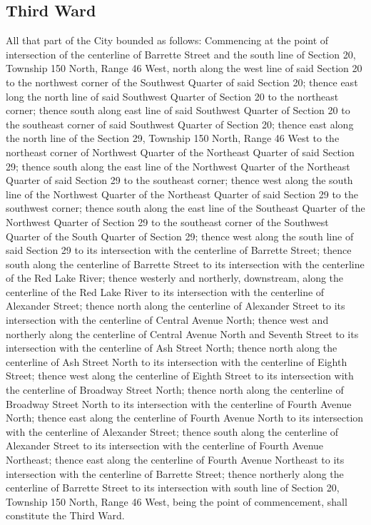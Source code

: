 \subsection{Third Ward}
All that part of the City bounded as follows:  Commencing at the point of intersection of the centerline of Barrette Street and the south line of Section 20, Township 150 North, Range 46 West, north along the west line of said Section 20 to the northwest corner of the Southwest Quarter of said Section 20; thence east long the north line of said Southwest Quarter of Section 20 to the northeast corner; thence south along east line of said Southwest Quarter of Section 20 to the southeast corner of said Southwest Quarter of Section 20; thence east along the north line of the Section 29, Township 150 North, Range 46 West to the northeast corner of Northwest Quarter of the Northeast Quarter of said Section 29; thence south along the east line of the Northwest Quarter of the Northeast Quarter of said Section 29 to the southeast corner; thence west along the south line of the Northwest Quarter of the Northeast Quarter of said Section 29 to the southwest corner; thence south along the east line of the Southeast Quarter of the Northwest Quarter of Section 29 to the southeast corner of the Southwest Quarter of the South Quarter of Section 29; thence west along the south line of said Section 29 to its intersection with the centerline of Barrette Street; thence south along the centerline of Barrette Street to its intersection with the centerline of the Red Lake River; thence westerly and northerly, downstream, along the centerline of the Red Lake River to its intersection with the centerline of Alexander Street; thence north along the centerline of Alexander Street to its intersection with the centerline of Central Avenue North; thence west and northerly along the centerline of Central Avenue North and Seventh Street to its intersection with the centerline of Ash Street North; thence north along the centerline of Ash Street North to its intersection with the centerline of Eighth Street; thence west along the centerline of Eighth Street to its intersection with the centerline of Broadway Street North; thence north along the centerline of Broadway Street North to its intersection with the centerline of Fourth Avenue North; thence east along the centerline of Fourth Avenue North to its intersection with the centerline of Alexander Street; thence south along the centerline of Alexander Street to its intersection with the centerline of Fourth Avenue Northeast; thence east along the centerline of Fourth Avenue Northeast to its intersection with the centerline of Barrette Street; thence northerly along the centerline of Barrette Street to its intersection with south line of Section 20, Township 150 North, Range 46 West, being the point of commencement, shall constitute the Third Ward.


